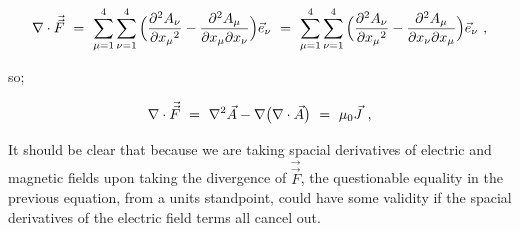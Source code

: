 \documentclass{article}
\begin{document}
\begin{equation} \label{eb-eq-1002-35}
\nabla \cdot \vec{\vec{F}} \hspace{0.125cm} = \hspace{0.125cm} \sum_{\mu = 1}^{4} \sum_{\nu = 1}^{4} \Big( \frac{\partial^2 A_{\nu}}{\partial{x_{\mu}}^2} - \frac{\partial^2 {A_{\mu}}}{\partial{x_{\mu}}\partial{x_{\nu}}} \Big) \vec{e}_{\nu} \hspace{0.125cm} = \hspace{0.125cm} \sum_{\mu = 1}^{4} \sum_{\nu = 1}^{4} \Big( \frac{\partial^2 A_{\nu}}{\partial{x_{\mu}}^2} - \frac{\partial^2 {A_{\mu}}}{\partial{x_{\nu}}\partial{x_{\mu}}} \Big) \vec{e}_{\nu} \hspace{0.125cm} ,
\end{equation}

so;

\begin{equation} \label{eb-eq-1002-36}
\nabla \cdot \vec{\vec{F}} \hspace{0.125cm} = \hspace{0.125cm} \nabla^2 \vec{A} - \nabla \big( \nabla \cdot \vec{A} \big) \hspace{0.125cm} = \hspace{0.125cm} \mu_0 \vec{J} \hspace{0.125cm} ,
\end{equation}

It should be clear that because we are taking spacial derivatives of electric and magnetic fields upon taking the divergence of \begin{math} \vec{\vec{F}} \end{math}, the questionable equality in the previous equation, from a units standpoint, could have some validity if the spacial derivatives of the electric field terms all cancel out. 
\end{document}
